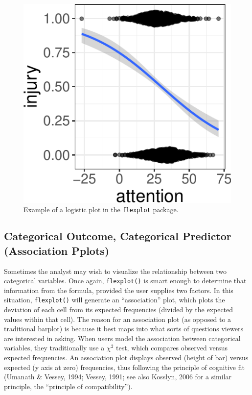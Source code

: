 \documentclass[
  man]{apa6}
\begin{document}
\begin{figure}
\centering
\includegraphics{flexplot_psychmeth_files/figure-latex/logistic-1.pdf}
\caption{\label{fig:logistic}Example of a logistic plot in the \texttt{flexplot} package.\label{fig:logistic}}
\end{figure}

\hypertarget{categorical-outcome-categorical-predictor-association-pplots}{%
\subsection{Categorical Outcome, Categorical Predictor (Association Pplots)}\label{categorical-outcome-categorical-predictor-association-pplots}}

Sometimes the analyst may wish to visualize the relationship between two categorical variables. Once again, \texttt{flexplot()} is smart enough to determine that information from the formula, provided the user supplies two factors. In this situation, \texttt{flexplot()} will generate an \enquote{association} plot, which plots the deviation of each cell from its expected frequencies (divided by the expected values within that cell). The reason for an association plot (as opposed to a traditional barplot) is because it best maps into what sorts of questions viewers are interested in asking. When users model the association between categorical variables, they traditionally use a \(\chi^2\) test, which compares observed versus expected frequencies. An association plot displays observed (height of bar) versus expected (y axis at zero) frequencies, thus following the principle of cognitive fit (Umanath \& Vessey, 1994; Vessey, 1991; see also Kosslyn, 2006 for a similar principle, the ``principle of compatibility'').
\end{document}
